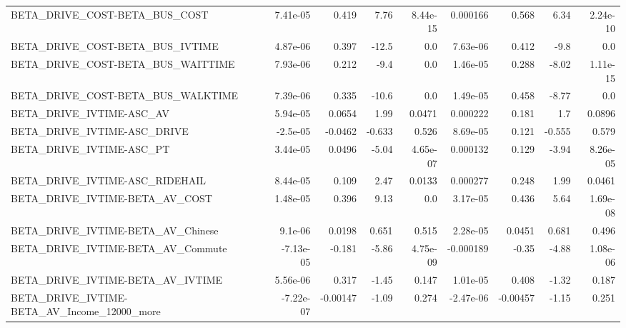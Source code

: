 \begin{tabular}{lrrrrrrrr}
BETA\_DRIVE\_COST-BETA\_BUS\_COST                      &    7.41e-05 &        0.419 &     7.76 & 8.44e-15 &   0.000166 &       0.568 &         6.34 &      2.24e-10 \\
BETA\_DRIVE\_COST-BETA\_BUS\_IVTIME                    &    4.87e-06 &        0.397 &    -12.5 &      0.0 &   7.63e-06 &       0.412 &         -9.8 &           0.0 \\
BETA\_DRIVE\_COST-BETA\_BUS\_WAITTIME                  &    7.93e-06 &        0.212 &     -9.4 &      0.0 &   1.46e-05 &       0.288 &        -8.02 &      1.11e-15 \\
BETA\_DRIVE\_COST-BETA\_BUS\_WALKTIME                  &    7.39e-06 &        0.335 &    -10.6 &      0.0 &   1.49e-05 &       0.458 &        -8.77 &           0.0 \\
BETA\_DRIVE\_IVTIME-ASC\_AV                           &    5.94e-05 &       0.0654 &     1.99 &   0.0471 &   0.000222 &       0.181 &          1.7 &        0.0896 \\
BETA\_DRIVE\_IVTIME-ASC\_DRIVE                        &    -2.5e-05 &      -0.0462 &   -0.633 &    0.526 &   8.69e-05 &       0.121 &       -0.555 &         0.579 \\
BETA\_DRIVE\_IVTIME-ASC\_PT                           &    3.44e-05 &       0.0496 &    -5.04 & 4.65e-07 &   0.000132 &       0.129 &        -3.94 &      8.26e-05 \\
BETA\_DRIVE\_IVTIME-ASC\_RIDEHAIL                     &    8.44e-05 &        0.109 &     2.47 &   0.0133 &   0.000277 &       0.248 &         1.99 &        0.0461 \\
BETA\_DRIVE\_IVTIME-BETA\_AV\_COST                     &    1.48e-05 &        0.396 &     9.13 &      0.0 &   3.17e-05 &       0.436 &         5.64 &      1.69e-08 \\
BETA\_DRIVE\_IVTIME-BETA\_AV\_Chinese                  &     9.1e-06 &       0.0198 &    0.651 &    0.515 &   2.28e-05 &      0.0451 &        0.681 &         0.496 \\
BETA\_DRIVE\_IVTIME-BETA\_AV\_Commute                  &   -7.13e-05 &       -0.181 &    -5.86 & 4.75e-09 &  -0.000189 &       -0.35 &        -4.88 &      1.08e-06 \\
BETA\_DRIVE\_IVTIME-BETA\_AV\_IVTIME                   &    5.56e-06 &        0.317 &    -1.45 &    0.147 &   1.01e-05 &       0.408 &        -1.32 &         0.187 \\
BETA\_DRIVE\_IVTIME-BETA\_AV\_Income\_12000\_more        &   -7.22e-07 &     -0.00147 &    -1.09 &    0.274 &  -2.47e-06 &    -0.00457 &        -1.15 &         0.251 \\

\end{tabular}
